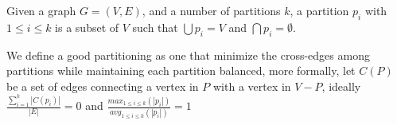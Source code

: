 
Given a graph $G = (V, E)$, and a number of partitions $k$, a partition $p_i$ with $1 \leq i \leq k$ is a subset of $V$ such that $\bigcup p_i = V$ and $\bigcap p_i = \emptyset$.

We define a good partitioning as one that minimize the cross-edges among partitions while maintaining each partition balanced, more formally, let $C(P)$ be a set of edges connecting a vertex in $P$ with a vertex in $V - P$, ideally $\frac{\sum_{i=1}^{k}|C(p_i)|}{|E|} = 0$ and $\frac{max_{1 \leq i \leq k}(|p_i|)}{avg_{1 \leq i \leq k}(|p_i|)} = 1$
